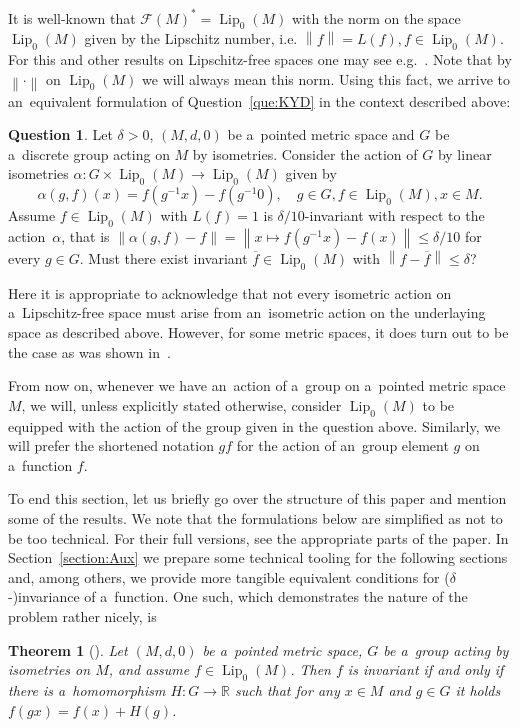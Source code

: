 \documentclass[11pt,a4paper]{amsart}
\newtheorem*{theorem*}{Theorem}
\theoremstyle{definition}
\newtheorem{question}[theorem]{Question}
\newcommand{\R}{\mathbb{R}}
\newcommand{\F}{\mathcal{F}}
\newcommand{\fBar}{\overline{f}}
\newcommand{\norm}[1]{\left\| #1 \right\|}
\newcommand{\Lipz}{\operatorname{Lip}_0}
\begin{document}
	It is well-known that $\F(M)^* = \Lipz(M)$ with the norm on the space $\Lipz(M)$ given by the Lipschitz number, i.e. $\norm{f} = L(f), f \in \Lipz(M)$. For this and other results on Lipschitz-free spaces one may see e.g.~\cite{WeaverLA}. Note that by $\norm{\cdot}$ on $\Lipz(M)$ we will always mean this norm. Using this fact, we arrive to an~equivalent formulation of Question~\ref{que:KYD} in the context described above:
	\begin{question} \label{que:KYDLip}
		Let $\delta > 0$, $(M, d, 0)$ be a~pointed metric space and $G$ be a~discrete group acting on $M$ by isometries. Consider the action of $G$ by linear isometries $\alpha: G \times \Lipz(M) \to \Lipz(M)$ given by
		\begin{equation*}
			\alpha(g, f)(x) = f(g^{-1}x) - f(g^{-1}0), \quad g \in G, f \in \Lipz(M), x \in M.
		\end{equation*}
		Assume $f \in \Lipz(M)$ with $L(f) = 1$ is $\delta/10$-invariant with respect to the action~$\alpha$, that is $\norm{\alpha(g, f) - f} = \norm{x \mapsto f(g^{-1}x) - f(x)} \leq \delta/10$ for every $g \in G$.
		Must there exist invariant $\fBar \in \Lipz(M)$ with $\norm{f - \fBar} \leq \delta$?
	\end{question}
	Here it is appropriate to acknowledge that not every isometric action on a~Lipschitz-free space must arise from an~isometric action on the underlaying space as described above. However, for some metric spaces, it does turn out to be the case as was shown in~\cite{CDT24}.
	
	From now on, whenever we have an~action of a~group on a~pointed metric space $M$, we will, unless explicitly stated otherwise, consider $\Lipz(M)$ to be equipped with the action of the group given in the question above. Similarly, we will prefer the shortened notation $gf$ for the action of an~group element $g$ on a~function $f$.
	
	 To end this section, let us briefly go over the structure of this paper and mention some of the results. We note that the formulations below are simplified as not to be too technical. For their full versions, see the appropriate parts of the paper. In Section~\ref{section:Aux} we prepare some technical tooling for the following sections and, among others, we provide more tangible equivalent conditions for ($\delta$-)invariance of a~function. One such, which demonstrates the nature of the problem rather nicely, is
	\begin{theorem*} []
		Let $(M, d, 0)$ be a~pointed metric space, $G$ be a~group acting by isometries on $M$, and assume $f \in \Lipz(M)$. Then $f$ is invariant if and only if there is a~homomorphism $H: G \to \R$ such that for any $x \in M$ and $g \in G$ it holds $f(gx) = f(x) + H(g)$.
	\end{theorem*}
	
\end{document}
